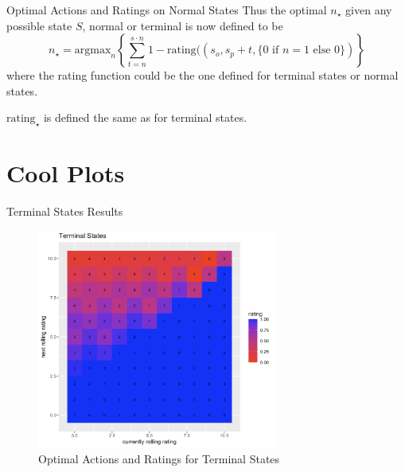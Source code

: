 \documentclass{beamer}
\begin{document}
\begin{frame}{Optimal Actions and Ratings on Normal States}
    Thus the optimal $n_{\star}$ given any possible state $S$, normal or terminal is now defined to be
    $$
    n_{\star} = \text{argmax}_{n} \left\{\sum_{t = n}^{s \cdot n} 1 - \text{rating}((s_o, s_p + t, \{0 \text{ if } n = 1 \text{ else } 0\}) \right\}
    $$
    where the rating function could be the one defined for terminal states or normal states.

    $\text{rating}_{\star}$ is defined the same as for terminal states.
\end{frame}

\section{Cool Plots}

\begin{frame}{Terminal States Results}
    \begin{figure}[h]
        \centering
        \includegraphics[width=0.7\textwidth]{Screenshot 2023-12-12 at 20.21.12.png}
        \caption{Optimal Actions and Ratings for Terminal States}
    \end{figure}
\end{frame}
\end{document}
